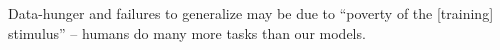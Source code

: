 \documentclass{beamer}
\newcommand\blfootnote[1]{%
  \begingroup
  \renewcommand\thefootnote{}\footnote{#1}%
  \addtocounter{footnote}{-1}%
  \endgroup
}
\begin{document}
\begin{frame}[standout]
Data-hunger and failures to generalize may be due to ``poverty of the [training] stimulus'' -- humans do many more tasks than our models.\par
\end{frame}

\end{document}
